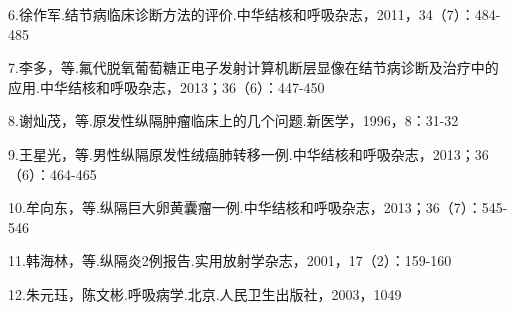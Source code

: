 6.徐作军.结节病临床诊断方法的评价.中华结核和呼吸杂志，2011，34（7）：484-485

7.李多，等.氟代脱氧葡萄糖正电子发射计算机断层显像在结节病诊断及治疗中的应用.中华结核和呼吸杂志，2013；36（6）：447-450

8.谢灿茂，等.原发性纵隔肿瘤临床上的几个问题.新医学，1996，8：31-32

9.王星光，等.男性纵隔原发性绒癌肺转移一例.中华结核和呼吸杂志，2013；36（6）：464-465

10.牟向东，等.纵隔巨大卵黄囊瘤一例.中华结核和呼吸杂志，2013；36（7）：545-546

11.韩海林，等.纵隔炎2例报告.实用放射学杂志，2001，17（2）：159-160

12.朱元珏，陈文彬.呼吸病学.北京.人民卫生出版社，2003，1049

\protect\hypertarget{text00084.html}{}{}

